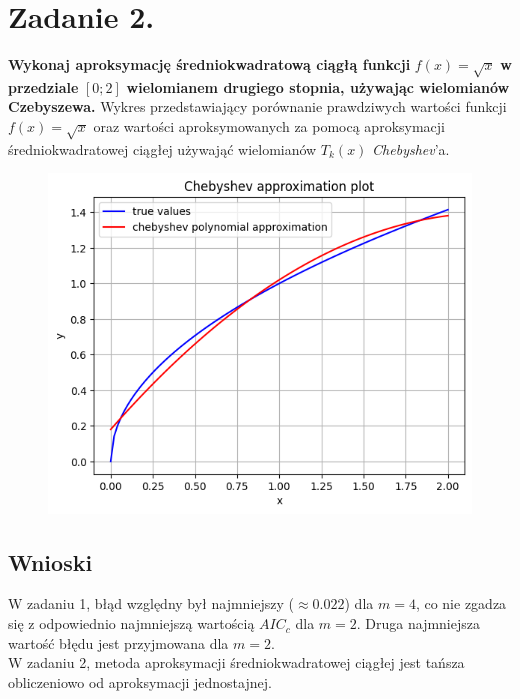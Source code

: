 \documentclass{article}
\begin{document}
\section*{Zadanie 2.}
\textbf{Wykonaj aproksymację średniokwadratową ciągłą funkcji}
$f(x) = \sqrt{x}$ \textbf{w przedziale} $[0;2]$ \textbf{wielomianem drugiego stopnia, używając wielomianów
Czebyszewa.}
\newpage
Wykres przedstawiający porównanie prawdziwych wartości funkcji 
$f(x) = \sqrt{x}$ oraz wartości aproksymowanych za pomocą aproksymacji średniokwadratowej ciągłej używająć wielomianów
$T_k(x)$ \textit{Chebyshev}'a.
\begin{figure}[H]
  \includegraphics[width=\linewidth]{figures/chebyshev.png}
\end{figure}


\subsection*{Wnioski}
\null\quad W zadaniu 1, błąd względny był najmniejszy ($\approx0.022$) dla $m=4$, co nie
zgadza się z odpowiednio najmniejszą wartością $AIC_c$ dla $m=2$. Druga najmniejsza wartość
błędu jest przyjmowana dla $m=2$. \\
\null\quad W zadaniu 2, metoda aproksymacji średniokwadratowej ciągłej
jest tańsza obliczeniowo od aproksymacji jednostajnej.
\end{document}
